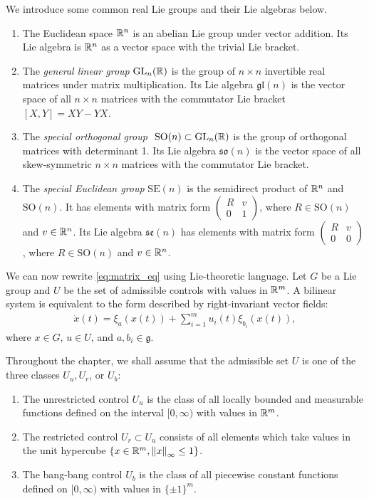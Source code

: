 \documentclass[12pt,class=article,crop=false]{standalone}
\begin{document}
\begin{defn}
We introduce some common real Lie groups and their Lie algebras below.
\begin{enumerate}[label=(\roman*)]
	\item The Euclidean space $ \mathbb{R}^{n}$ is an abelian Lie group under vector addition. Its Lie algebra is $ \mathbb{R}^{n}$ as a vector space with the trivial Lie bracket.
	\item The \emph{general linear group} $ \text{GL}_{ n}(\mathbb{R}) $ is the group of $ n\times n$ invertible real matrices under matrix multiplication. Its Lie algebra $ \mathfrak{gl}(n) $ is the vector space of all $ n\times n$ matrices with the commutator Lie bracket $ [X,Y] = XY-YX$.
	\item The \emph{special orthogonal group} $ \text{ SO}(n) \subset  \text{GL}_{ n}(\mathbb{R}) $ is the group of orthogonal matrices with determinant 1. Its Lie algebra $ \mathfrak{so}(n) $ is the vector space of all skew-symmetric $ n\times n$ matrices with the commutator Lie bracket.
	\item The \emph{special Euclidean group} $ \text{SE}(n) $ is the semidirect product of $ \mathbb{R}^{n}$ and $ \text{SO}(n) $. It has elements with matrix form $ \begin{pmatrix} R&v\\0&1 \end{pmatrix} $, where $ R \in \text{SO}(n)$ and $ v \in \mathbb{R}^{n}$. Its Lie algebra $ \mathfrak{se}(n) $ has elements with matrix form $ \begin{pmatrix} R&v\\0&0 \end{pmatrix} $, where $ R \in \text{SO}(n) $ and $ v \in \mathbb{R}^{n}$.
\end{enumerate}
\end{defn}

We can now rewrite \cref{eq:matrix_eq} using Lie-theoretic language. Let $ G$ be a Lie group and $ U$ be the set of admissible controls with values in  $ \mathbb{R}^{m}$. A bilinear system is equivalent to the form described by right-invariant vector fields:
\begin{align}\label{eq:group_eq} 
	\dot{x}(t) =\xi_a(x(t)) + \sum_{ i= 1}^{ m} u_i(t) \xi_{b_i} (x(t)),
\end{align}
where $ x \in G$, $ u \in U$, and $ a, b_i \in \mathfrak{g} $.


Throughout the chapter, we shall assume that the admissible set $ U$ is one of the three classes  $ U_u, U_r$, or  $ U_b$:
\begin{enumerate}[label=(\roman*)]
	\item The unrestricted control $ U_u$ is the class of all locally bounded and measurable functions defined on the interval  $ [0,\infty)$ with values in $ \mathbb{R}^{m}$.
	\item The restricted control $ U_r \subset U_u$ consists of all elements which take values in the unit hypercube $ \{x \in \mathbb{R}^{m}, {\left\lVert{ x}\right\rVert}_{ \infty} \leq 1 \} $. 
	\item The bang-bang control $ U_b$ is the class of all piecewise constant functions defined on  $ [0,\infty)$ with values in $ \{\pm 1\}^{m}$.
\end{enumerate}
\end{document}
